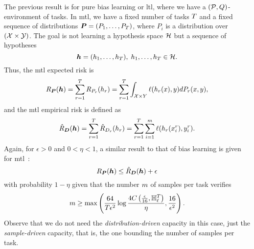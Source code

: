 The previous result is for pure bias learning or \acrshort{ltl}, where we have a $(\mathcal{P}, Q)$-environment of tasks. In \acrshort{mtl}, we have a fixed number of tasks $T$ and a fixed sequence of distributions $\bm{P} = (P_1, \ldots, P_T)$, where $P_i$ is a distribution over $(\mathcal{X} \times \mathcal{Y})$. The goal is not learning a hypothesis space $\mathcal{H}$ but a sequence of hypotheses $$\bm{h} = (h_1, \ldots, h_T),\; h_1, \ldots, h_T \in \mathcal{H} .$$
Thus, the \acrshort{mtl} expected risk is
\begin{equation}\label{eq:mtlearn_exprisk}
    \risk_{\bprobseq}(\myvec{\hypf}) = \sum_{r=1}^\ntasks \risk_{P_r}(\hypf_r)  = \sum_{r=1}^\ntasks \int_{\Xspace \times Y} \lossf(\hypf_r(x), y) d{P_r}(x, y),
\end{equation}
and the \acrshort{mtl} empirical risk is defined as
\begin{equation}\label{eq:mtlearn_emprisk}
    \bemprisk(\myvec{\hypf}) = \sum_{r=1}^\ntasks \hat{\risk}_{\sample_r}(\hypf_r) = \sum_{r=1}^\ntasks \sum_{i=1}^m \lossf(\hypf_r(x_i^r), y_i^r).
\end{equation}
Again, for $\epsilon > 0$ and $0 < \eta < 1$, a similar result to that of bias learning is given for \acrshort{mtl}~\cite[Theorem~4]{baxter2000model}:
\begin{equation}
    \nonumber
    R_{\bm{P}}(\bm{h}) \leq \hat{R}_{\bm{D}}(\bm{h}) + \epsilon
\end{equation}
with probability $1 - \eta$ given that the number $m$ of samples per task verifies
\begin{equation}
    \nonumber
    m \geq \max \left( \frac{64}{T \epsilon^2} \log\frac{4C\left(\frac{\epsilon}{16}, \mathbb{H}^{T}_\ell\right)}{\eta} , \frac{16}{\epsilon^2}\right).
\end{equation}
Observe that we do not need the \emph{distribution-driven} capacity in this case, just the \emph{sample-driven} capacity, that is, the one bounding the number of samples per task.

